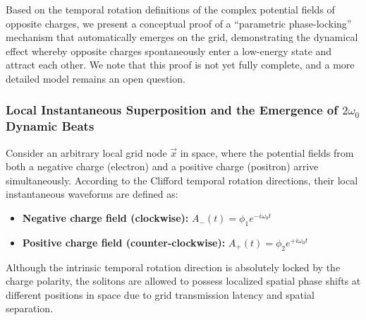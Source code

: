 \documentclass[12pt, a4paper]{article}
\begin{document}
Based on the temporal rotation definitions of the complex potential fields of opposite charges, we present a conceptual proof of a ``parametric phase-locking'' mechanism that automatically emerges on the grid, demonstrating the dynamical effect whereby opposite charges spontaneously enter a low-energy state and attract each other. We note that this proof is not yet fully complete, and a more detailed model remains an open question.

\subsubsection{Local Instantaneous Superposition and the Emergence of $2\omega_0$ Dynamic Beats}

Consider an arbitrary local grid node $\vec{x}$ in space, where the potential fields from both a negative charge (electron) and a positive charge (positron) arrive simultaneously. According to the Clifford temporal rotation directions, their local instantaneous waveforms are defined as:
\begin{itemize}
    \item \textbf{Negative charge field (clockwise):} $A_-(t) = \phi_1 e^{-i\omega_0 t}$
    \item \textbf{Positive charge field (counter-clockwise):} $A_+(t) = \phi_2 e^{+i\omega_0 t}$
\end{itemize}
Although the intrinsic temporal rotation direction is absolutely locked by the charge polarity, the solitons are allowed to possess localized spatial phase shifts at different positions in space due to grid transmission latency and spatial separation.
\end{document}
